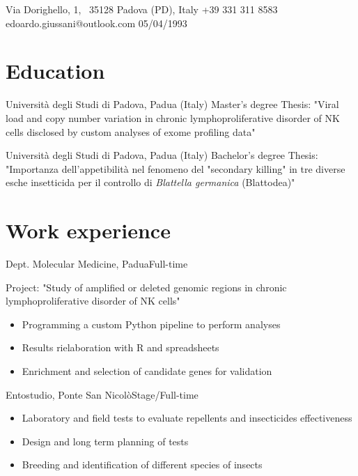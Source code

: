\documentclass{fancy_cv}
\author{Edoardo Giussani}
\begin{document}
    {Via Dorighello, 1, \ 35128 Padova (PD), Italy}
    {+39 331 311 8583}
    {edoardo.giussani@outlook.com}
    {05/04/1993}

    \section{Education}
            {Università degli Studi di Padova, Padua (Italy)} {Master's degree}
            {Thesis: "Viral load and copy number variation in chronic 
            lymphoproliferative disorder of NK cells disclosed by custom analyses
            of exome profiling data"}
        \medskip

            {Università degli Studi di Padova, Padua (Italy)} {Bachelor's degree}
            {Thesis: "Importanza dell'appetibilità nel fenomeno del "secondary 
            killing" in tre diverse esche insetticida per il controllo
            di \textit{Blattella germanica} (Blattodea)"}


    \section{Work experience}
            {Dept. Molecular Medicine, Padua}{Full-time}
            {Project: "Study of amplified or deleted genomic regions in chronic 
            lymphoproliferative disorder of NK cells"
            \begin{itemize}
                \item Programming a custom Python pipeline to perform analyses
                \item Results rielaboration with R and spreadsheets
                \item Enrichment and selection of candidate genes for validation 
            \end{itemize}}
        \medskip

            {Entostudio, Ponte San Nicolò}{Stage/Full-time}
            {\begin{itemize}
                \item Laboratory and field tests to evaluate repellents and insecticides effectiveness 
                \item Design and long term planning of tests
                \item Breeding and identification of different species of insects
            \end{itemize}}
\end{document}
